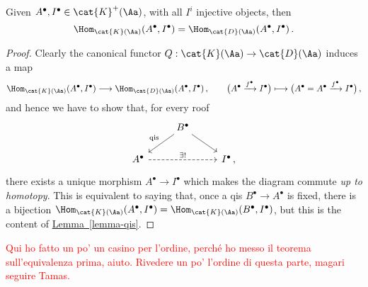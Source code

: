 \begin{lemma}
    Given $A^{\bullet}, I^{\bullet} \in \cat{K}^{+}(\Aa)$,
    with all $I^{i}$ injective objects, then
    \begin{equation*}
        \Hom_{\cat{K}(\Aa)}(A^{\bullet}, I^{\bullet})
        = \Hom_{\cat{D}(\Aa)}(A^{\bullet}, I^{\bullet})\,.
    \end{equation*}
    \begin{proof}
        Clearly the canonical functor $Q:\cat{K}(\Aa) \to \cat{D}(\Aa)$
        induces a map 
        \begin{equation*}
        \Hom_{\cat{K}(\Aa)}(A^{\bullet}, I^{\bullet})
        \longrightarrow \Hom_{\cat{D}(\Aa)}(A^{\bullet}, I^{\bullet})\,,
        \qquad
        \big(A^{\bullet} \xrightarrow{f^{\bullet}} I^{\bullet}\big)
        \longmapsto \big(A^{\bullet} = A^{\bullet} \xrightarrow{f^{\bullet}} I^{\bullet}\big)\,,
        \end{equation*}
        and hence we have to show that, for every roof
        \begin{equation*}
            \begin{tikzcd}
                & B^{\bullet} \ar[dl, "\textrm{qis}"'] \ar[dr] & \\
                A^{\bullet} \ar[rr, dashed, "\exists !"]
                & & I^{\bullet} \,,
            \end{tikzcd}
        \end{equation*}
        there exists a unique morphism $A^{\bullet} \to I^{\bullet}$
        which makes the diagram commute \emph{up to homotopy}.
        This is equivalent to saying that, 
        once a qis $B^{\bullet} \to A^{\bullet}$ is fixed,
        there is a bijection 
        $\Hom_{\cat{K}(\Aa)}(A^{\bullet}, I^{\bullet})
        = \Hom_{\cat{K}(\Aa)}(B^{\bullet}, I^{\bullet})$,
        but this is the content of \hyperref[lemma-qis]{Lemma~\ref*{lemma-qis}}.
    \end{proof}
\end{lemma}

\textcolor{red}{Qui ho fatto un po' un casino per l'ordine,
perché ho messo il teorema sull'equivalenza prima, aiuto.
Rivedere un po' l'ordine di questa parte, magari seguire Tamas.}